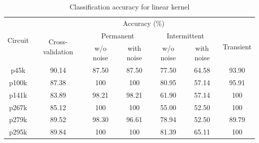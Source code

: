 \begin{table}[h]

	\captionsetup{justification=centering}
\begin{tabular}{ccccccc}
\hline
\multicolumn{1}{c}{\multirow{3}{*}{Circuit}} & \multicolumn{6}{c}{Accuracy (\%)}\\ \cline{2-7} 
\multicolumn{1}{c}{}                         & \multicolumn{1}{c}{\multirow{2}{*}{Cross-validation}} & \multicolumn{2}{c}{Permanent} & \multicolumn{2}{c}{Intermittent} & \multicolumn{1}{c}{\multirow{2}{*}{Transient}} \\ \cline{3-6}
                                             &                                                       & w/o noise     & with noise    & w/o noise      & with noise      &                                                \\ \hline
p45k                                         & 90.14                                                 & 87.50         & 87.50         & 77.50          & 64.58           & 93.90                                          \\
p100k                                        & 87.38                                                 & 100           & 100           & 80.95          & 57.14           & 95.91                                          \\
p141k                                        & 83.89                                                 & 98.21         & 98.21         & 61.90          & 57.14           & 100                                            \\
p267k                                        & 85.12                                                 & 100           & 100           & 55.00          & 52.50           & 100                                            \\
p279k                                        & 89.52                                                 & 98.30         & 96.61         & 78.94          & 52.50           & 89.79                                          \\
p295k                                        & 89.84                                                 & 100           & 100           & 81.39          & 65.11           & 100   \\
\hline                                        
\end{tabular}
\caption {Classification accuracy for linear kernel}
\label{tab:linwp}
\end{table}

